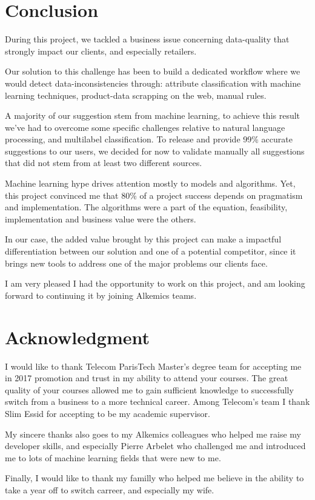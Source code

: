 \chapter*{Conclusion} %
\label{cha:conclusion}


During this project, we tackled a business issue concerning data-quality that strongly impact our clients, and especially retailers.

Our solution to this challenge has been to build a dedicated workflow where we would detect data-inconsistencies through: attribute classification with machine learning techniques, product-data scrapping on the web, manual rules.

A majority of our suggestion stem from machine learning, to achieve this result we've had to overcome some specific challenges relative to natural language processing, and multilabel classification. To release and provide 99\% accurate suggestions to our users, we decided for now to validate manually all suggestions that did not stem from at least two different sources.

Machine learning hype drives attention mostly to models and algorithms.  Yet, this project convinced me that 80\% of a project success depends on pragmatism and implementation. The algorithms were a part of the equation, feasibility, implementation and business value were the others.

In our case, the added value brought by this project can make a impactful differentiation between our solution and one of a potential competitor, since it brings new tools to address one of the major problems our clients face.

I am very pleased I had the opportunity to work on this project, and am looking forward to continuing it by joining Alkemics teams.

\chapter*{Acknowledgment}

I would like to thank Telecom ParisTech Master's degree team for accepting me in 2017 promotion and trust in my ability to attend your courses. The great quality of your courses allowed me to gain sufficient knowledge to successfully switch from a business to a more technical career. Among Telecom's team I thank Slim Essid for accepting to be my academic supervisor.

My sincere thanks also goes to my Alkemics colleagues who helped me raise my developer skills, and especially Pierre Arbelet who challenged me and introduced me to lots of machine learning fields that were new to me.

Finally, I would like to thank my familly who helped me believe in the ability to take a year off to switch carreer, and especially my wife.

